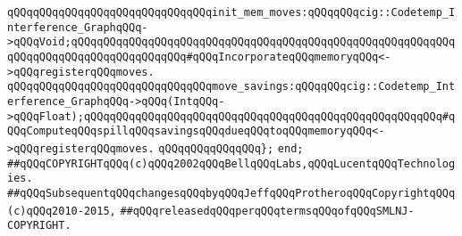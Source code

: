 \newline
\newline
\verb|qQQqqQQqqQQqqQQqqQQqqQQqqQQqqQQqinit_mem_moves:qQQqqQQqcig::Codetemp_Interference_GraphqQQq->qQQqVoid;qQQqqQQqqQQqqQQqqQQqqQQqqQQqqQQqqQQqqQQqqQQqqQQqqQQqqQQqqQQqqQQqqQQqqQQqqQQqqQQqqQQqqQQq#qQQqIncorporateqQQqmemoryqQQq<->qQQqregisterqQQqmoves.|\newline
\newline
\newline
\verb|qQQqqQQqqQQqqQQqqQQqqQQqqQQqqQQqmove_savings:qQQqqQQqcig::Codetemp_Interference_GraphqQQq->qQQq(IntqQQq->qQQqFloat);qQQqqQQqqQQqqQQqqQQqqQQqqQQqqQQqqQQqqQQqqQQqqQQqqQQqqQQq#qQQqComputeqQQqspillqQQqsavingsqQQqdueqQQqtoqQQqmemoryqQQq<->qQQqregisterqQQqmoves.|\newline
\verb|qQQqqQQqqQQqqQQq};|\newline
\verb|end;|\newline
\newline
\verb|##qQQqCOPYRIGHTqQQq(c)qQQq2002qQQqBellqQQqLabs,qQQqLucentqQQqTechnologies.|\newline
\verb|##qQQqSubsequentqQQqchangesqQQqbyqQQqJeffqQQqProtheroqQQqCopyrightqQQq(c)qQQq2010-2015,|\newline
\verb|##qQQqreleasedqQQqperqQQqtermsqQQqofqQQqSMLNJ-COPYRIGHT.|\newline

